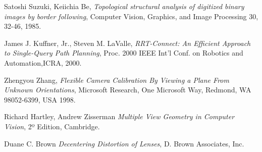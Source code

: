 \begin{thebibliography}{9}

	Satoshi Suzuki, Keiichia Be,
	\emph{Topological structural analysis of digitized binary images by border following},
	Computer Vision, Graphics, and Image Processing 30, 32-46,
	1985.

	James J. Kuffner, Jr., Steven M. LaValle,
	\emph{RRT-Connect: An Efficient Approach to Single-Query Path Planning},
	Proc. 2000 IEEE Int’l Conf. on Robotics and Automation,ICRA, 2000.

	Zhengyou Zhang,
	\emph{Flexible Camera Calibration By Viewing a Plane From Unknown Orientations},
	Microsoft Research, One Microsoft Way, Redmond, WA 98052-6399, USA
	1998.

	Richard Hartley, Andrew Zisserman
	\emph{Multiple View Geometry in Computer Vision},
	2º Edition, Cambridge.

	Duane C. Brown
	\emph{Decentering Distortion of Lenses},
	D. Brown Associates, Inc.

\end{thebibliography}